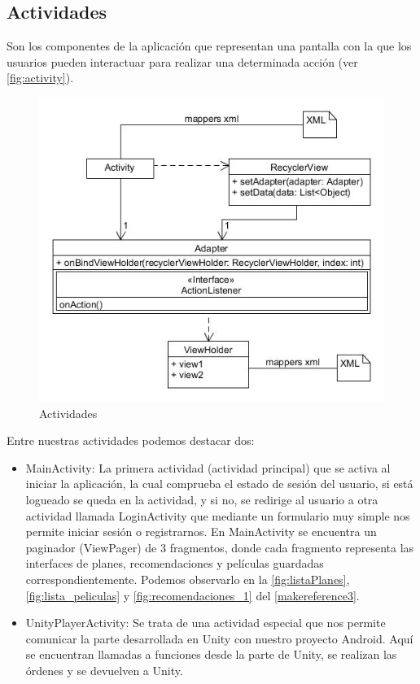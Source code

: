 \subsection{Actividades}
\label{makereference4.4.1}
Son los componentes de la aplicación que representan una pantalla con la que
 los usuarios pueden interactuar para realizar una determinada
 acción (ver \autoref{fig:activity}).
\begin{figure}[H]
    \centering
    \includegraphics[width=6in]{figures/chapter-4/recyclerView.jpg}
    \caption{Actividades}
    \label{fig:activity}
\end{figure}

Entre nuestras actividades podemos destacar dos: 
\begin{itemize}
    \item MainActivity: La primera actividad (actividad principal) que se activa al iniciar la aplicación, la cual comprueba el estado de sesión del usuario, si está logueado se queda en la actividad, y si no, se redirige al usuario a otra actividad llamada LoginActivity que mediante un formulario muy simple nos permite iniciar sesión o registrarnos. En MainActivity se encuentra un paginador (ViewPager) de 3 fragmentos, donde cada fragmento representa las interfaces de planes, recomendaciones y películas guardadas correspondientemente. Podemos observarlo en la \autoref{fig:listaPlanes}, \autoref{fig:lista_peliculas} y \autoref{fig:recomendaciones_1} del \autoref{makereference3}.
    \item UnityPlayerActivity: Se trata de una actividad especial que nos permite comunicar la parte desarrollada en Unity con nuestro proyecto Android. Aquí se encuentran llamadas a funciones desde la parte de Unity, se realizan las órdenes y se devuelven a Unity.
\end{itemize} 

